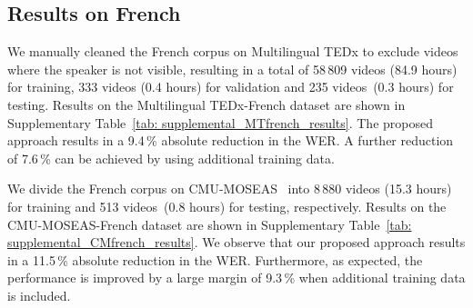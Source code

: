 \documentclass[twocolumn]{article}
\begin{document}
 \begin{table*}[!tb]
\caption{The architecture of the 1D-CNN front-end module. The filter shapes are denoted by  for 1D Convolutional Layers, respectively. The sizes correspond to [Batch Size, Channels, Sequence Length].  denotes the length of audio waveforms.}
\begin{center}{}
\end{center}
\label{net:1dcnn_frontend}

\end{table*} 
\subsection{Results on French}
We manually cleaned the French corpus on Multilingual TEDx to exclude videos where the speaker is not visible, resulting in a total of 58\,809 videos (84.9 hours) for training, 333 videos (0.4 hours) for validation and 235 videos~(0.3 hours) for testing. Results on the Multilingual TEDx-French dataset are shown in Supplementary Table~\ref{tab: supplemental_MTfrench_results}. The proposed approach results in a 9.4\,\% absolute reduction in the WER. A further reduction of 7.6\,\% can be achieved by using additional training data.

We divide the French corpus on CMU-MOSEAS~\cite{bagher-zadeh-etal-2020-cmu} into 8\,880 videos (15.3 hours) for training and 513 videos~(0.8 hours) for testing, respectively. Results on the CMU-MOSEAS-French dataset are shown in Supplementary Table~\ref{tab: supplemental_CMfrench_results}. We observe that our proposed approach results in a 11.5\,\% absolute reduction in the WER. Furthermore, as expected, the performance is improved by a large margin of 9.3\,\% when additional training data is included.
\end{document}
